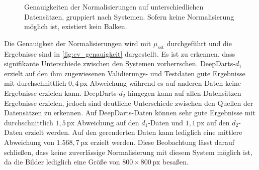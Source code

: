 \begin{figure}
    \centering
    \caption{Genauigkeiten der Normalisierungen auf unterschiedlichen Datensätzen, gruppiert nach Systemen. Sofern keine Normalisierung möglich ist, existiert kein Balken.}
    \label{fig:cv_genauigkeit}
\end{figure}

Die Genauigkeit der Normalisierungen wird mit $\mu_\text{xst}$ durchgeführt und die Ergebnisse sind in \autoref{fig:cv_genauigkeit} dargestellt. Es ist zu erkennen, dass signifikante Unterschiede zwischen den Systemen vorherrschen. DeepDarts-$d_1$ erzielt auf den ihm zugewiesenen Validierungs- und Testdaten gute Ergebnisse mit durchschnittlich $0,\!4\,\text{px}$ Abweichung während es auf anderen Daten keine Ergebnisse erzielen kann. DeepDarts-$d_2$ hingegen kann auf allen Datensätzen Ergebnisse erzielen, jedoch sind deutliche Unterschiede zwischen den Quellen der Datensätzen zu erkennen. Auf DeepDarts-Daten können sehr gute Ergebnisse mit durchschnittlich $1,\!5\,\text{px}$ Abweichung auf den $d_1$-Daten und $1,\!1\,\text{px}$ auf den $d_2$-Daten erzielt werden. Auf den gerenderten Daten kann lediglich eine mittlere Abweichung von $1.568,\!7\,\text{px}$ erzielt werden. Diese Beobachtung lässt darauf schließen, dass keine zuverlässige Normalisierung mit diesem System möglich ist, da die Bilder lediglich eine Größe von $800 \times 800\,\text{px}$ besaßen.

